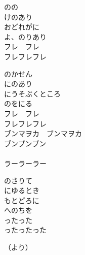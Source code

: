 \documentclass[10pt,b5j]{tarticle} %
\begin{document}
\vspace{1.5em} %
\newcommand{\linespace}{0.5em} %
\newcommand{\blocksize}{0.5\hsize} %
\begin{enumerate} %
    \begin{minipage}[c]{\blocksize}
    
        \vspace{\linespace}
        \item
        のの\\
        けのあり\\
        おどれがに\\
        よ、のりあり\\
        フレ　フレ\\
        フレフレフレ
        
        \vspace{\linespace}
        \item
        のかせん\\
        にのあり\\
        にうそぶくところ\\
        のをにる\\
        フレ　フレ\\
        フレフレフレ\\
        ブンマヲカ　ブンマヲカ\\
        ブンブンブン\\
        　\\
        ラーラーラー
        
        \vspace{\linespace}
        \item
        のさりて\\
        にゆるとき\\
        もとどろに\\
        へのちを\\
        ったった\\
        ったったった
        
        
        \vspace{\linespace}
        \item
        （より）
    
    \end{minipage}
\end{enumerate} %
\end{document}
